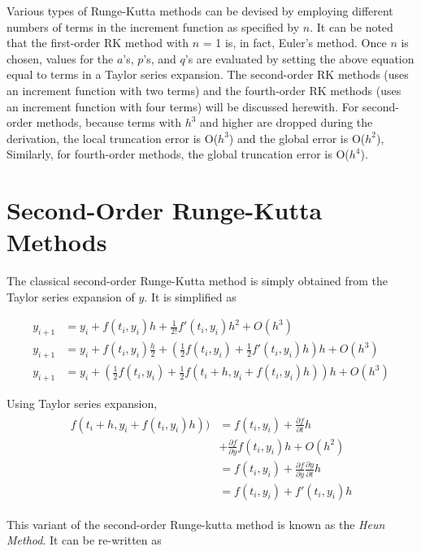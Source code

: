\documentclass[book.tex]{subfiles}
\begin{document}
Various types of Runge-Kutta methods can be devised by employing different numbers
of terms in the increment function as specified by $n$. It can be noted that the first-order RK method with $n$ = 1 is, in fact, Euler’s method. Once $n$ is chosen, values for the $a$’s, $p$’s, and $q$’s are evaluated by setting the above equation equal to terms in a Taylor series expansion. The second-order RK methods (uses an increment
function with two terms) and the fourth-order RK methods (uses an increment
function with four terms) will be discussed herewith. For second-order methods, because terms with $h^3$ and higher are dropped during the derivation, the local truncation error is O($h^3$) and the global error is O($h^2$), Similarly, for fourth-order methods, the global truncation error is O($h^4$).

\section{Second-Order Runge-Kutta Methods}

The classical second-order Runge-Kutta method is simply obtained from the Taylor series expansion of $y$. It is simplified as

\begin{align}
y_{i+1} &= y_i + f(t_i,y_i)h + \frac{1}{2!}f'(t_i,y_i)h^2 + O(h^3)	\\
y_{i+1} &= y_i + f(t_i,y_i)\frac{h}{2} + \left (\frac{1}{2}f(t_i,y_i) + \frac{1}{2}f'(t_i,y_i)h \right )h + O(h^3)\\
y_{i+1} &= y_i + \left (\frac{1}{2}f(t_i,y_i) + \frac{1}{2}f(t_i+h,y_i + f(t_i,y_i)h)\right )h + O(h^3)
\end{align}

\begin{marginfigure}
	Using Taylor series expansion,
\begin{align}
	\begin{split}
f(t_i+h,y_i + f(t_i,y_i)h))& = f(t_i,y_i) + \frac{\partial f}{\partial t}h \\
& + \frac{\partial f}{\partial y}f(t_i,y_i)h+ O(h^2) \\
& = f(t_i,y_i) + \frac{\partial f}{\partial y}\frac{\partial y}{\partial t}h \\
& = f(t_i,y_i) + f'(t_i,y_i)h 
\end{split}
\end{align}	
\end{marginfigure}
This variant of the second-order Runge-kutta method is known as the \textit{Heun Method}. It can be re-written as
\end{document}
